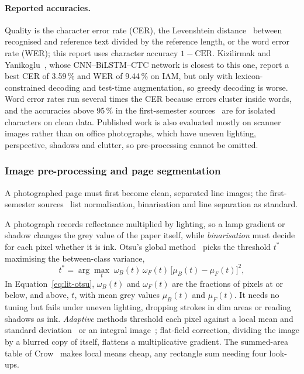 \paragraph{Reported accuracies.}\label{sec:lit-acc} Quality is the character error rate (CER), the Levenshtein distance~\cite{levenshtein1966} between recognised and reference text divided by the reference length, or the word error rate (WER); this report uses character accuracy $1-\text{CER}$. Kizilirmak and Yanikoglu~\cite{kizilirmak2023}, whose CNN--BiLSTM--CTC network is closest to this one, report a best CER of 3.59\,\% and WER of 9.44\,\% on IAM, but only with lexicon-constrained decoding and test-time augmentation, so greedy decoding is worse. Word error rates run several times the CER because errors cluster inside words, and the accuracies above 95\,\% in the first-semester sources~\cite{yahya2021,ji2021,chen2023} are for isolated characters on clean data. Published work is also evaluated mostly on scanner images rather than on office photographs, which have uneven lighting, perspective, shadows and clutter, so pre-processing cannot be omitted.

\subsubsection{Image pre-processing and page segmentation}
\label{sec:lit-prep}

A photographed page must first become clean, separated line images; the first-semester sources~\cite{chen2023,hemanth2022} list normalisation, binarisation and line separation as standard.

A photograph records reflectance multiplied by lighting, so a lamp gradient or shadow changes the grey value of the paper itself, while \emph{binarisation} must decide for each pixel whether it is ink. Otsu's global method~\cite{otsu1979} picks the threshold $t^{*}$ maximising the between-class variance,
\begin{equation}
t^{*}=\arg\max_{t}\;\omega_{B}(t)\,\omega_{F}(t)\,\bigl[\mu_{B}(t)-\mu_{F}(t)\bigr]^{2},
\label{eq:lit-otsu}
\end{equation}
In Equation~\ref{eq:lit-otsu}, $\omega_B(t)$ and $\omega_F(t)$ are the fractions of pixels at or below, and above, $t$, with mean grey values $\mu_B(t)$ and $\mu_F(t)$. It needs no tuning but fails under uneven lighting, dropping strokes in dim areas or reading shadows as ink. \emph{Adaptive} methods threshold each pixel against a local mean and standard deviation~\cite{sauvola2000} or an integral image~\cite{bradley2007}; flat-field correction, dividing the image by a blurred copy of itself, flattens a multiplicative gradient. The summed-area table of Crow~\cite{crow1984} makes local means cheap, any rectangle sum needing four look-ups.

